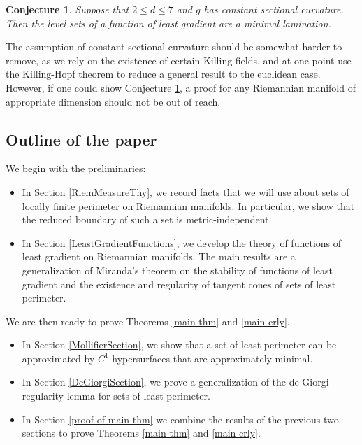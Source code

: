 \documentclass[reqno,12pt,letterpaper]{amsart}
\newtheorem{conjecture}[theorem]{Conjecture}
\theoremstyle{definition}
\numberwithin{equation}{section}
\begin{document}
\begin{conjecture}\label{main conj}
Suppose that $2 \leq d \leq 7$ and $g$ has constant sectional curvature.
Then the level sets of a function of least gradient are a minimal lamination.
\end{conjecture}

The assumption of constant sectional curvature should be somewhat harder to remove, as we rely on the existence of certain Killing fields, and at one point use the Killing-Hopf theorem to reduce a general result to the euclidean case.
However, if one could show Conjecture \ref{main conj}, a proof for any Riemannian manifold of appropriate dimension should not be out of reach.


\subsection{Outline of the paper}
We begin with the preliminaries:
\begin{itemize}
\item In Section \ref{RiemMeasureThy}, we record facts that we will use about sets of locally finite perimeter on Riemannian manifolds. In particular, we show that the reduced boundary of such a set is metric-independent.
\item In Section \ref{LeastGradientFunctions}, we develop the theory of functions of least gradient on Riemannian manifolds. The main results are a generalization of Miranda's theorem \cite[Teorema 3]{Miranda67} on the stability of functions of least gradient and the existence and regularity of tangent cones of sets of least perimeter.
\end{itemize}
We are then ready to prove Theorems \ref{main thm} and \ref{main crly}.
\begin{itemize}
\item In Section \ref{MollifierSection}, we show that a set of least perimeter can be approximated by $C^1$ hypersurfaces that are approximately minimal.
\item In Section \ref{DeGiorgiSection}, we prove a generalization of the de Giorgi regularity lemma \cite[Teorema 5.7]{Miranda66} for sets of least perimeter.
\item In Section \ref{proof of main thm} we combine the results of the previous two sections to prove Theorems \ref{main thm} and \ref{main crly}.
\end{itemize}
\end{document}
